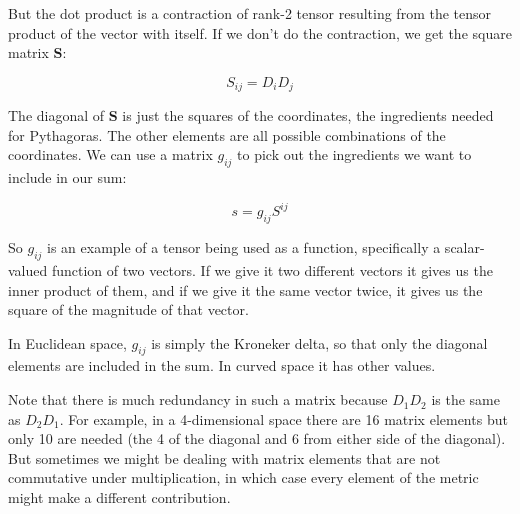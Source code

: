 But the dot product is a contraction of rank-2 tensor resulting from the tensor product of the vector with itself. If we don't do the contraction, we get the square matrix $\boldsymbol{S}$:

$$S_{ij} = D_iD_j$$

The diagonal of $\boldsymbol{S}$ is just the squares of the coordinates, the ingredients needed for Pythagoras. The other elements are all possible combinations of the coordinates. We can use a matrix $g_{ij}$ to pick out the ingredients we want to include in our sum:

$$s = g_{ij}S^{ij}$$

So $g_{ij}$ is an example of a tensor being used as a function, specifically a scalar-valued function of two vectors. If we give it two different vectors it gives us the inner product of them, and if we give it the same vector twice, it gives us the square of the magnitude of that vector.

In Euclidean space, $g_{ij}$ is simply the Kroneker delta, so that only the diagonal elements are included in the sum. In curved space it has other values.

Note that there is much redundancy in such a matrix because $D_1D_2$ is the same as $D_2D_1$. For example, in a 4-dimensional space there are 16 matrix elements but only 10 are needed (the 4 of the diagonal and 6 from either side of the diagonal). But sometimes we might be dealing with matrix elements that are not commutative under multiplication, in which case every element of the metric might make a different contribution.
